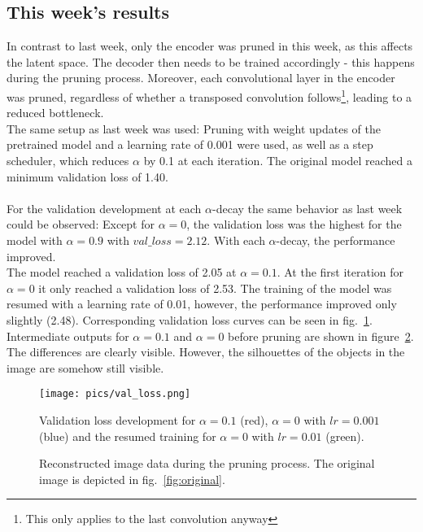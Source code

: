 \documentclass[10pt,twocolumn,letterpaper]{article}
\begin{document}
\subsection{This week's results}
In contrast to last week, only the encoder was pruned in this week, as this affects the latent space.
The decoder then needs to be trained accordingly - this happens during the pruning process.
Moreover, each convolutional layer in the encoder was pruned, regardless of whether a transposed convolution follows\footnote{This only applies to the last convolution anyway}, leading to a reduced bottleneck.\\
The same setup as last week was used:
Pruning with weight updates of the pretrained model and a learning rate of 0.001 were used, as well as a step scheduler, which reduces $\alpha$ by 0.1 at each iteration.
The original model reached a minimum validation loss of 1.40.\\\\
For the validation development at each $\alpha$-decay the same behavior as last week could be observed:
Except for $\alpha=0$, the validation loss was the highest for the model with $\alpha=0.9$ with $val\_loss=2.12$.
With each $\alpha$-decay, the performance improved.\\
The model reached a validation loss of 2.05 at $\alpha=0.1$.
At the first iteration for $\alpha=0$ it only reached a validation loss of 2.53.
The training of the model was resumed with a learning rate of 0.01, however, the performance improved only slightly (2.48).
Corresponding validation loss curves can be seen in fig.~\ref{fig:curve}.
Intermediate outputs for $\alpha=0.1$ and $\alpha=0$ before pruning are shown in figure~\ref{fig:results}.
The differences are clearly visible.
However, the silhouettes of the objects in the image are somehow still visible.
\begin{figure}[hpbt]
	\centering
	\texttt{[image: pics/val\_loss.png]}
	\caption{Validation loss development for $\alpha=0.1$ (red), $\alpha=0$ with $lr=0.001$ (blue) and the resumed training for $\alpha=0$ with $lr=0.01$ (green).}
	\label{fig:curve}
\end{figure}
\begin{figure}[hpbt]
	\centering
	\qquad
	\caption[]{Reconstructed image data during the pruning process. The original image is depicted in fig.~\ref{fig:original}.}
	\label{fig:results}
\end{figure}
\end{document}
